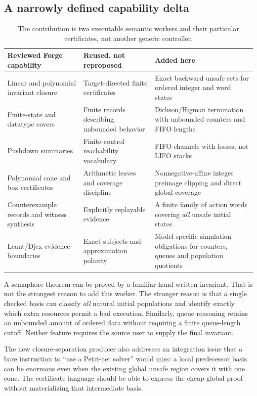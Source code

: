 \documentclass[11pt,a4paper]{article}
\theoremstyle{definition}
\begin{document}
\subsection{A narrowly defined capability delta}
\begin{table}[htbp]
\centering\small
\begin{tabularx}{\textwidth}{@{}p{}XX@{}}
\toprule
Reviewed Forge capability & Reused, not reproposed & Added here\\
\midrule
Linear and polynomial invariant closure & Target-directed finite certificates & Exact backward unsafe sets for ordered integer and word states\\
Finite-state and datatype covers & Finite records describing unbounded behavior & Dickson/Higman termination with unbounded counters and FIFO lengths\\
Pushdown summaries & Finite-control reachability vocabulary & FIFO channels with losses, not LIFO stacks\\
Polynomial cone and box certificates & Arithmetic leaves and coverage discipline & Nonnegative-affine integer preimage clipping and direct global coverage\\
Counterexample records and witness synthesis & Explicitly replayable evidence & A finite family of action words covering \emph{all} unsafe initial states\\
Leant/Djex evidence boundaries & Exact subjects and approximation polarity & Model-specific simulation obligations for counters, queues and population quotients\\
\bottomrule
\end{tabularx}
\caption{The contribution is two executable semantic workers and their particular certificates, not another generic controller.}
\end{table}

A semaphore theorem can be proved by a familiar hand-written invariant. That
is not the strongest reason to add this worker. The stronger reason is that a
single checked basis can classify \emph{all} natural initial populations and
identify exactly which extra resources permit a bad execution. Similarly,
queue reasoning retains an unbounded amount of ordered data without requiring
a finite queue-length cutoff. Neither feature requires the source user to
supply the final invariant.

The new closure-separation producer also addresses an integration issue that
a bare instruction to ``use a Petri-net solver'' would miss: a local predecessor
basis can be enormous even when the existing global unsafe region covers it
with one cone. The certificate language should be able to express the cheap
global proof without materializing that intermediate basis.
\end{document}
